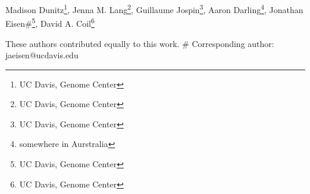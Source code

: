 Madison Dunitz\*\footnote{UC Davis, Genome Center}, Jenna M. Lang\*\footnote{UC Davis, Genome Center}, Guillaume Jospin\footnote{UC Davis, Genome Center}, Aaron Darling\footnote{somewhere in Aurstralia}, Jonathan Eisen\#\footnote{UC Davis, Genome Center}, David A. Coil\footnote{UC Davis, Genome Center} 

\* These authors contributed equally to this work.
\# Corresponding author: jaeisen@ucdavis.edu